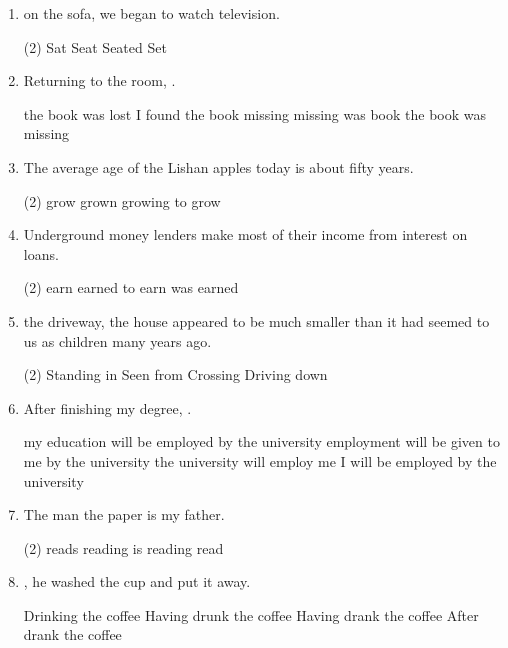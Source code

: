 \begin{enumerate}
\item \ttu on the sofa, we began to watch television.
\begin{tasks}(2)
  \task Sat
  \task Seat
  \task Seated
  \task Set
\end{tasks}

\item Returning to the room, \ttu.
\begin{tasks}
  \task the book was lost
  \task I found the book missing
  \task missing was book
  \task the book was missing
\end{tasks}

\item The average age of the Lishan apples \ttu today is about fifty years.
\begin{tasks}(2)
  \task grow
  \task grown
  \task growing
  \task to grow
\end{tasks}

\item Underground money lenders make most of their income from interest \ttu on loans.
\begin{tasks}(2)
  \task earn
  \task earned
  \task to earn
  \task was earned
\end{tasks}

\item \ttu the driveway, the house appeared to be much smaller than it had
  seemed to us as children many years ago.
\begin{tasks}(2)
  \task Standing in
  \task Seen from
  \task Crossing
  \task Driving down
\end{tasks}

\item After finishing my degree, \ttu.
\begin{tasks}
  \task my education will be employed by the university
  \task employment will be given to me by the university
  \task the university will employ me
  \task I will be employed by the university
\end{tasks}

\item The man \ttu the paper is my father.
\begin{tasks}(2)
  \task reads
  \task reading
  \task is reading
  \task read
\end{tasks}

\item \ttu, he washed the cup and put it away.
\begin{tasks}
  \task Drinking the coffee
  \task Having drunk the coffee
  \task Having drank the coffee
  \task After drank the coffee
\end{tasks}


\end{enumerate}
